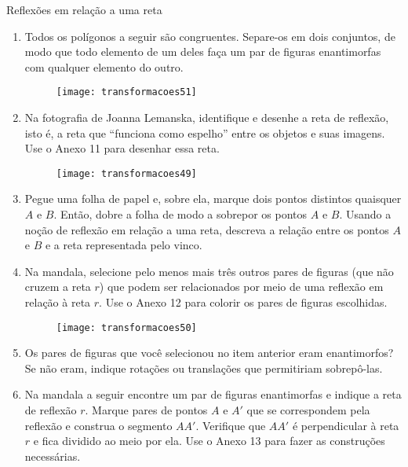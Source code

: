 \begin{task}{Reflexões em relação a uma reta}

\begin{enumerate}
\item Todos os polígonos a seguir são congruentes. Separe-os em dois conjuntos, de modo que todo elemento de um deles faça um par de figuras enantimorfas com qualquer elemento do outro.  

\begin{figure}[H]
\centering

\texttt{[image: transformacoes51]}
\end{figure}

\item Na fotografia de Joanna Lemanska, identifique e desenhe a reta de reflexão, isto é, a reta que “funciona como espelho” entre os objetos e suas imagens. Use o Anexo 11 para desenhar essa reta.

\begin{figure}[H]
\centering

\texttt{[image: transformacoes49]}
\end{figure}

\item Pegue uma folha de papel e, sobre ela, marque dois pontos distintos quaisquer $A$ e $B$. Então, dobre a folha de modo a sobrepor os pontos $A$ e $B$. Usando a noção de reflexão em relação a uma reta, descreva a relação entre os pontos $A$ e $B$ e a reta representada pelo vinco.

\item Na mandala, selecione pelo menos mais três outros pares de figuras (que não cruzem a reta $r$) que podem ser relacionados por meio de uma reflexão em relação à reta $r$. Use o Anexo 12 para colorir os pares de figuras escolhidas.

\begin{figure}[H]
\centering

\texttt{[image: transformacoes50]}
\end{figure}

\item Os pares de figuras que você selecionou no item anterior eram enantimorfos? Se não eram, indique rotações ou translações que permitiriam sobrepô-las.

\item Na mandala a seguir encontre um par de figuras enantimorfas e indique a reta de reflexão $r$. Marque pares de pontos $A$ e $A'$ que se correspondem pela reflexão e construa o segmento $AA'$. Verifique que $AA'$ é perpendicular à reta $r$ e fica dividido ao meio por ela. Use o Anexo 13 para fazer as construções necessárias.


\end{enumerate}
\end{task}
